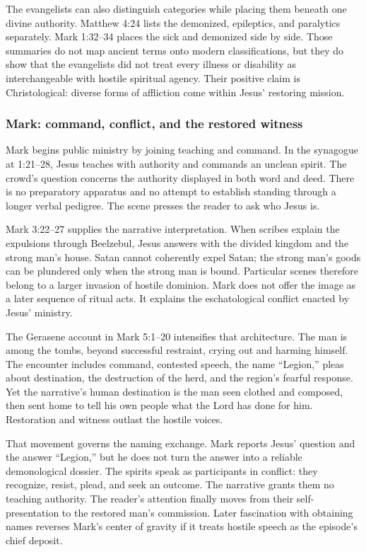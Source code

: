 The evangelists can also distinguish categories while placing them beneath
one divine authority. Matthew 4:24 lists the demonized, epileptics, and
paralytics separately. Mark 1:32--34 places the sick and demonized side by
side. Those summaries do not map ancient terms onto modern classifications,
but they do show that the evangelists did not treat every illness or
disability as interchangeable with hostile spiritual agency. Their positive
claim is Christological: diverse forms of affliction come within Jesus'
restoring mission.

\subsubsection{Mark: command, conflict, and the restored witness}

Mark begins public ministry by joining teaching and command. In the synagogue
at 1:21--28, Jesus teaches with authority and commands an unclean spirit. The
crowd's question concerns the authority displayed in both word and deed.
There is no preparatory apparatus and no attempt to establish standing
through a longer verbal pedigree. The scene presses the reader to ask who
Jesus is.

Mark 3:22--27 supplies the narrative interpretation. When scribes explain the
expulsions through Beelzebul, Jesus answers with the divided kingdom and the
strong man's house. Satan cannot coherently expel Satan; the strong man's
goods can be plundered only when the strong man is bound. Particular scenes
therefore belong to a larger invasion of hostile dominion. Mark does not
offer the image as a later sequence of ritual acts. It explains the
eschatological conflict enacted by Jesus' ministry.

The Gerasene account in Mark 5:1--20 intensifies that architecture. The man is
among the tombs, beyond successful restraint, crying out and harming himself.
The encounter includes command, contested speech, the name ``Legion,'' pleas
about destination, the destruction of the herd, and the region's fearful
response. Yet the narrative's human destination is the man seen clothed and
composed, then sent home to tell his own people what the Lord has done for
him. Restoration and witness outlast the hostile voices.

That movement governs the naming exchange. Mark reports Jesus' question and
the answer ``Legion,'' but he does not turn the answer into a reliable
demonological dossier. The spirits speak as participants in conflict: they
recognize, resist, plead, and seek an outcome. The narrative grants them no
teaching authority. The reader's attention finally moves from their
self-presentation to the restored man's commission. Later fascination with
obtaining names reverses Mark's center of gravity if it treats hostile speech
as the episode's chief deposit.

